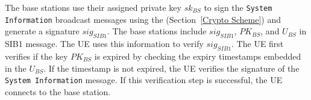 The base stations use their assigned private key $sk_{BS}$ to sign the \texttt{System Information} broadcast messages using the \scheme{} (Section~\ref{Crypto Scheme}) and generate a signature $sig_{SIB1}$. The base stations include $sig_{SIB1}$, $PK_{BS}$, and $U_{BS}$ in SIB1 message.
The UE uses this information to verify $sig_{SIB1}$. The UE first verifies if the key $PK_{BS}$ is expired by checking the expiry timestamps embedded in the $U_{BS}$. If the timestamp is not expired, the UE verifies the signature of the \texttt{System Information} message. If this verification step is successful, the UE connects to the base station.